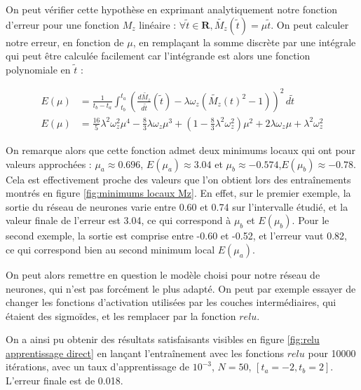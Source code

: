 \documentclass[12pt]{report}
\begin{document}
On peut vérifier cette hypothèse en exprimant analytiquement notre fonction d'erreur pour une fonction $M_z$ linéaire : $\forall \tilde{t} \in \mathbf{R}, \tilde{M_z}(\tilde{t}) = \mu  \tilde{t}$. 
On peut calculer notre erreur, en fonction de $\mu$, en remplaçant la somme discrète par une intégrale qui peut être calculée facilement car 
l'intégrande est alors une fonction polynomiale en $\tilde{t}$ :

\begin{equation}
    \begin{aligned}
        E(\mu) &= \frac{1}{t_b-t_a}\int_{t_b}^{t_a} (\frac{d\tilde{M_z}}{d\tilde{t}}(\tilde{t})-\lambda \omega_z (\tilde{M_z}(t)^2-1))^2 \,d \tilde{t} \\
        E(\mu) &= \frac{16}{5}\lambda^2\omega_z^2\mu^4 
            - \frac{8}{3}\lambda\omega_z\mu^3
            + (1- \frac{8}{3}\lambda^2\omega_z^2)\mu^2
            + 2\lambda\omega_z\mu
            + \lambda^2\omega_z^2
    \end{aligned}
    \label{eq:fonction d'erreur analytique, M_z linéaire}
\end{equation}

On remarque alors que cette fonction admet deux minimums locaux qui ont pour valeurs approchées : $ \mu_a \approx 0.696$, $E(\mu_a) \approx 3.04$ et $\mu_b \approx -0.574$,$ E(\mu_b) \approx -0.78$. 
Cela est effectivement proche des valeurs que l'on obtient lors des entraînements montrés en figure \ref{fig:minimums locaux Mz}.
En effet, sur le premier exemple, la sortie du réseau de neurones varie entre 0.60 et 0.74 sur l'intervalle étudié, et la valeur finale de l'erreur est 3.04, ce qui correspond à $\mu_b$ et $E(\mu_b)$.
Pour le second exemple, la sortie est comprise entre -0.60 et -0.52, et l'erreur vaut 0.82, ce qui correspond bien au second minimum local $E(\mu_a)$.

On peut alors remettre en question le modèle choisi pour notre réseau de neurones, qui n'est pas forcément le plus adapté. 
On peut par exemple essayer de changer les fonctions d'activation utilisées par les couches intermédiaires, qui étaient des sigmoïdes, et les remplacer par la fonction $relu$.

On a ainsi pu obtenir des résultats satisfaisants visibles en figure \ref{fig:relu apprentissage direct} en lançant l'entraînement avec les fonctions $relu$ pour 10000 itérations, avec un taux d'apprentissage de $10^{-3}$, $N=50$, $[t_a = -2, t_b = 2]$.
L'erreur finale est de 0.018.
\end{document}
